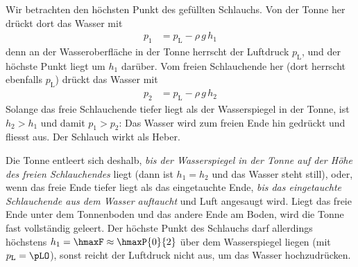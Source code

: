 \begin{center}
\end{center}

Wir betrachten den höchsten Punkt des gefüllten Schlauchs. Von der Tonne her drückt dort das Wasser mit
\begin{align}
 p_1 &= p_\text{L} - \rho\,g\,h_1
\end{align}
denn an der Wasseroberfläche in der Tonne herrscht der Luftdruck $p_\text{L}$, und der höchste Punkt liegt um $h_1$ darüber. Vom freien Schlauchende her (dort herrscht ebenfalls $p_\text{L}$) drückt das Wasser mit
\begin{align}
 p_2 &= p_\text{L} - \rho\,g\,h_2
\end{align}
Solange das freie Schlauchende tiefer liegt als der Wasserspiegel in der Tonne, ist $h_2 > h_1$ und damit $p_1 > p_2$: Das Wasser wird zum freien Ende hin gedrückt und fliesst aus. Der Schlauch wirkt als Heber.

Die Tonne entleert sich deshalb, \emph{bis der Wasserspiegel in der Tonne auf der Höhe des freien Schlauchendes} liegt (dann ist $h_1 = h_2$ und das Wasser steht still), oder, wenn das freie Ende tiefer liegt als das eingetauchte Ende, \emph{bis das eingetauchte Schlauchende aus dem Wasser auftaucht} und Luft angesaugt wird. Liegt das freie Ende unter dem Tonnenboden und das andere Ende am Boden, wird die Tonne fast vollständig geleert. Der höchste Punkt des Schlauchs darf allerdings höchstens $h_1 = \hmaxF \approx \hmaxP{0}{2}$ über dem Wasserspiegel liegen (mit $p_\text{L} = \pLO$), sonst reicht der Luftdruck nicht aus, um das Wasser hochzudrücken.

